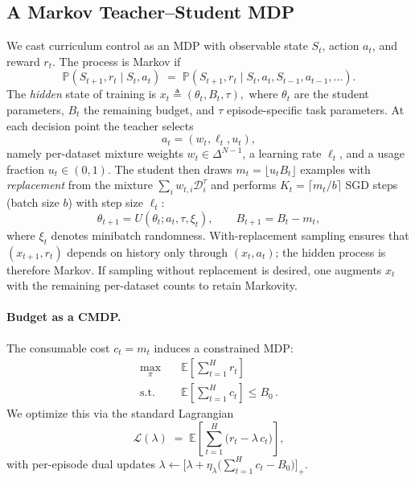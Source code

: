\documentclass[11pt]{article}
\newcommand{\E}{\mathbb{E}}
\newcommand{\1}{\mathbf{1}}
\newcommand{\Prb}{\mathbb{P}}
\begin{document}
\subsection{A Markov Teacher--Student MDP}\label{sec:mdp}
We cast curriculum control as an MDP with observable state $S_t$, action $a_t$, and reward $r_t$. The process is Markov if
\begin{equation}
\Prb(S_{t+1}, r_t \mid S_t, a_t) \;=\; \Prb(S_{t+1}, r_t \mid S_t, a_t, S_{t-1}, a_{t-1}, \dots).
\label{eq:markov}
\end{equation}
The \emph{hidden} state of training is
\(
x_t \triangleq (\theta_t, B_t, \tau),
\)
where $\theta_t$ are the student parameters, $B_t$ the remaining budget, and $\tau$ episode-specific task parameters. At each decision point the teacher selects
\[
a_t=(w_t,\ell_t,u_t),
\]
namely per-dataset mixture weights $w_t\in\Delta^{N-1}$, a learning rate $\ell_t$, and a usage fraction $u_t\in(0,1)$. The student then draws $m_t=\lfloor u_t B_t\rfloor$ examples with \emph{replacement} from the mixture $\sum_i w_{t,i}\mathcal{D}_i^\tau$ and performs $K_t=\lceil m_t/b\rceil$ SGD steps (batch size $b$) with step size $\ell_t$:
\begin{equation}
\theta_{t+1} = U(\theta_t; a_t,\tau,\xi_t), \qquad B_{t+1}=B_t-m_t,
\end{equation}
where $\xi_t$ denotes minibatch randomness. With-replacement sampling ensures that $(x_{t+1},r_t)$ depends on history only through $(x_t,a_t)$; the hidden process is therefore Markov. If sampling without replacement is desired, one augments $x_t$ with the remaining per-dataset counts to retain Markovity.

\paragraph{Budget as a CMDP.}
The consumable cost $c_t=m_t$ induces a constrained MDP:
\begin{equation}
\label{eq:cmdp}
\begin{aligned}
\max_{\pi}\quad & \E\!\left[\sum_{t=1}^{H} r_t\right] \\
\text{s.t.}\quad & \E\!\left[\sum_{t=1}^{H} c_t\right] \le B_0 \, .
\end{aligned}
\end{equation}
We optimize this via the standard Lagrangian
\begin{equation}
\label{eq:lagrangian}
\mathcal{L}(\lambda) \;=\; \E\!\left[\sum_{t=1}^{H} \big(r_t-\lambda\,c_t\big)\right],
\end{equation}
with per-episode dual updates $\lambda \leftarrow \big[\lambda + \eta_\lambda\big(\sum_{t=1}^{H} c_t - B_0\big)\big]_+$.
\end{document}
